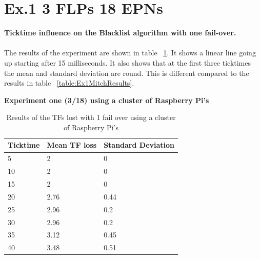 \newpage

\section{Ex.1 3 FLPs 18 EPNs}
\textbf{Ticktime influence on the Blacklist algorithm with one fail-over.}
\\~\\
The results of the experiment are shown in table ~\ref{table:Ex1318Results}. It shows a linear line going up starting after 15 milliseconds. It also shows that at the first three ticktimes the mean and standard deviation are round. This is different compared to the results in table ~\ref{table:Ex1MitchResults}.

\begin{table}[h!]
\caption*{\textbf{Experiment one (3/18) using a cluster of Raspberry Pi's}}
\begin{tabular}{| l | l | l |}
\hline
Ticktime & Mean TF loss & Standard Deviation \\ \hline
5 & 2 & 0 \\ \hline
10 & 2 & 0 \\ \hline
15 & 2 & 0 \\ \hline
20 & 2.76 & 0.44 \\ \hline
25 & 2.96 & 0.2 \\ \hline
30 & 2.96 & 0.2 \\ \hline
35 & 3.12 & 0.45 \\ \hline
40 & 3.48 & 0.51 \\ \hline
\end{tabular}
\caption{Results of the TFs lost with 1 fail over using a cluster of Raspberry Pi's}
\label{table:Ex1318Results}
\end{table}




